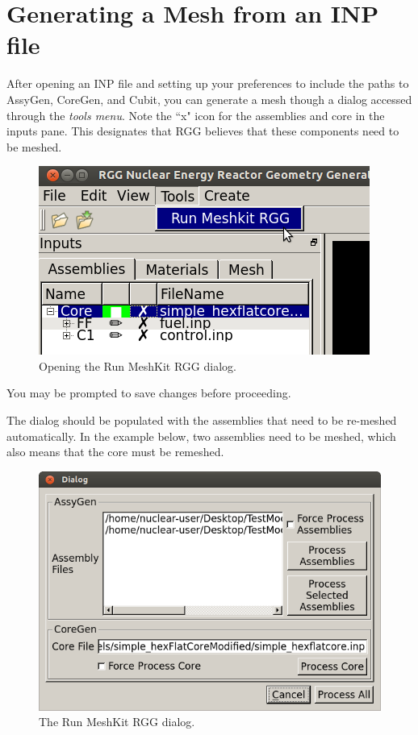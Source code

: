 \section{Generating a Mesh from an INP file}

After opening an INP file and setting up your preferences to include the paths to AssyGen, CoreGen, and Cubit, you can generate a mesh though a dialog accessed through the \emph{tools menu}.  Note the ``x" icon for the assemblies and core in the inputs pane.  This designates that RGG believes that these components need to be meshed.

\begin{figure}[H]
	\begin{center}
		\includegraphics[width=0.5\linewidth]{Images/mesh-3.png}
		\caption{Opening the Run MeshKit RGG dialog.}
		\label{fig:Mesh3}
	\end{center}
\end{figure}

You may be prompted to save changes before proceeding.

The dialog should be populated with the assemblies that need to be re-meshed automatically.  In the example below, two assemblies need to be meshed, which also means that the core must be remeshed.

\begin{figure}[H]
	\begin{center}
		\includegraphics[width=0.5\linewidth]{Images/mesh-4.png}
		\caption{The Run MeshKit RGG dialog.}
		\label{fig:Mesh4}
	\end{center}
\end{figure}

